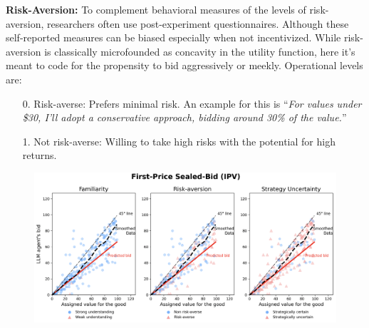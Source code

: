 \documentclass{article} %
\begin{document}


\textbf{Risk-Aversion:} 
To complement behavioral measures of the levels of risk-aversion, researchers often use post-experiment questionnaires.
Although these self-reported measures can be biased especially when not incentivized. 
While risk-aversion is classically microfounded as concavity in the utility function, here it's meant to code for the propensity to bid aggressively or meekly. Operational levels are: 
\begin{enumerate}
    \item[0.] Risk-averse: Prefers minimal risk.
    An example for this is ``\textit{For values under \$30, I'll adopt a conservative approach, bidding around 30\% of the value.}''
    \item[1. ] Not risk-averse: Willing to take high risks with the potential for high returns.        
\end{enumerate}



\begin{figure}[h]
    \centering \includegraphics[width=\linewidth]{Figs/First_semantic.png}
    \caption{ }
    \label{fig:FP-Semantic}
\end{figure}
\end{document}
